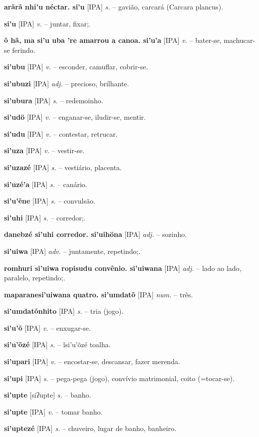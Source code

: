 \textbf{arãrã nhi'u néctar. si'u} [IPA] \textit{s.} -- gavião, carcará (Carcara plancus).

\textbf{si'u} [IPA] \textit{v.} -- juntar, fixar;.

\textbf{õ hã, ma si'u uba 're amarrou a canoa. si'u'a} [IPA] \textit{v.} -- bater-se, machucar-se ferindo.

\textbf{si'ubu} [IPA] \textit{v.} -- esconder, camuflar, cobrir-se.

\textbf{si'ubuzi} [IPA] \textit{adj.} -- precioso, brilhante.

\textbf{si'ubura} [IPA] \textit{s.} -- redemoinho.

\textbf{si'udö} [IPA] \textit{v.} -- enganar-se, iludir-se, mentir.

\textbf{si'udu} [IPA] \textit{v.} -- contestar, retrucar.

\textbf{si'uza} [IPA] \textit{v.} -- vestir-se.

\textbf{si'uzazé} [IPA] \textit{s.} -- vestiário, placenta.

\textbf{si'uzé'a} [IPA] \textit{s.} -- canário.

\textbf{si'u'ẽne} [IPA] \textit{s.} -- convulsão.

\textbf{si'uhi} [IPA] \textit{s.} -- corredor;.

\textbf{danebzé si'uhi corredor. si'uihöna} [IPA] \textit{adj.} -- sozinho.

\textbf{si'uiwa} [IPA] \textit{adv.} -- juntamente, repetindo;.

\textbf{romhuri si'uiwa ropisudu convênio. si'uiwana} [IPA] \textit{adj.} -- lado ao lado, paralelo, repetindo;.

\textbf{maparanesi'uiwana quatro. si'umdatõ} [IPA] \textit{num.} -- três.

\textbf{si'umdatõnhito} [IPA] \textit{s.} -- tria (jogo).

\textbf{si'u'õ} [IPA] \textit{v.} -- enxugar-se.

\textbf{si'u'õzé} [IPA] \textit{s.} -- ĩsi'u'õzé toalha.

\textbf{si'upari} [IPA] \textit{v.} -- encostar-se, descansar, fazer merenda.

\textbf{si'upi} [IPA] \textit{s.} -- pega-pega (jogo), convívio matrimonial, coito (=tocar-se).

\textbf{si'upte} [siʔupte] \textit{s.} -- banho.

\textbf{si'upte} [IPA] \textit{v.} -- tomar banho.

\textbf{si'uptezé} [IPA] \textit{s.} -- chuveiro, lugar de banho, banheiro.

